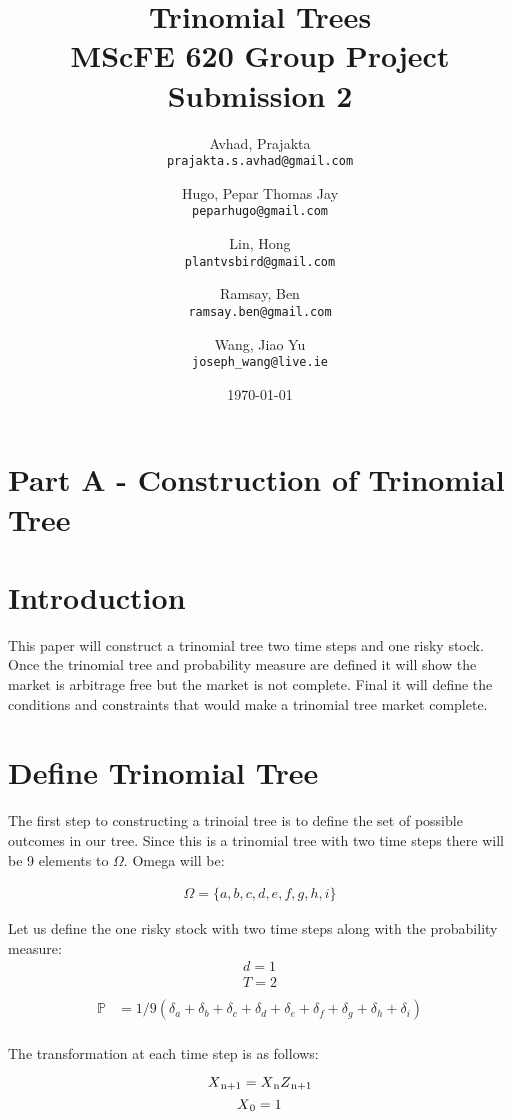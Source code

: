 \documentclass{article}
\title{Trinomial Trees \\ MScFE 620 Group Project Submission 2}
\date{\today}
\author{
  Avhad, Prajakta\\
  \texttt{prajakta.s.avhad@gmail.com}
  \and
  Hugo, Pepar Thomas Jay\\
  \texttt{peparhugo@gmail.com}
  \and
  Lin, Hong\\
  \texttt{plantvsbird@gmail.com}
  \and
  Ramsay, Ben\\
  \texttt{ramsay.ben@gmail.com}
  \and
  Wang, Jiao Yu\\
  \texttt{joseph\_wang@live.ie}
}
\begin{document}
\maketitle  


\section{Part A - Construction of Trinomial Tree}

\section{Introduction}

This paper will construct a trinomial tree two time steps and one risky stock. Once the trinomial tree and probability measure are defined it will show the market is arbitrage free but the market is not complete. Final it will define the conditions and constraints that would make a trinomial tree market complete.

\section{Define Trinomial Tree}

The first step to constructing a trinoial tree is to define the set of possible outcomes in our tree. Since this is a trinomial tree with two time steps there will be 9 elements to $\Omega$. Omega will be:

\begin{align*}
  \Omega = \{ a, b, c, d, e, f, g, h, i \}
\end{align*}


Let us define the one risky stock with two time steps along with the probability measure:
\begin{align*}
    d=1 \\
    T=2 \\
\end{align*}
\begin{align*}
    \mathbb{P} & = 1/9(\delta_a + \delta_b + \delta_c +\delta_d + \delta_e + \delta_f + \delta_g + \delta_h + \delta_i \label{eq:pstar}) \\
\end{align*}

The transformation at each time step is as follows:

\begin{equation}
 X\textsubscript{n+1}=X\textsubscript{n}Z\textsubscript{n+1} \label{eq:x_transformation}
\end{equation}
\begin{equation}
 X\textsubscript{0}=1
\end{equation}
\end{document}
